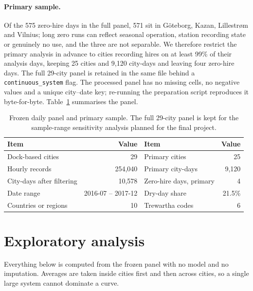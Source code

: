 \documentclass{article}
\begin{document}
\paragraph{Primary sample.} Of the 575 zero-hire days in the full panel, 571 sit
in G{\"o}teborg, Kazan, Lillestr{\o}m and Vilnius; long zero runs can reflect
seasonal operation, station recording state or genuinely no use, and the three
are not separable. We therefore restrict the primary analysis in advance to
cities recording hires on at least 99\% of their analysis days, keeping 25 cities
and 9{,}120 city-days and leaving four zero-hire days. The full 29-city panel is
retained in the same file behind a \texttt{continuous\_system} flag. The
processed panel has no missing cells, no negative values and a unique
city--date key; re-running the preparation script reproduces it byte-for-byte.
Table~\ref{tab:audit} summarises the panel.

\begin{table}[t]
  \centering
  \caption{Frozen daily panel and primary sample. The full 29-city panel is kept
  for the sample-range sensitivity analysis planned for the final project.}
  \label{tab:audit}
  \footnotesize
  \begin{tabular}{lrlr}
    \toprule
    \textbf{Item} & \textbf{Value} & \textbf{Item} & \textbf{Value} \\
    \midrule
    Dock-based cities          & 29              & Primary cities          & 25 \\
    Hourly records             & 254{,}040       & Primary city-days       & 9{,}120 \\
    City-days after filtering  & 10{,}578        & Zero-hire days, primary & 4 \\
    Date range                 & 2016-07 -- 2017-12 & Dry-day share        & 21.5\% \\
    Countries or regions       & 10              & Trewartha codes         & 6 \\
    \bottomrule
  \end{tabular}
\end{table}

\section{Exploratory analysis}
\label{sec:eda}

Everything below is computed from the frozen panel with no model and no
imputation. Averages are taken inside cities first and then across cities, so a
single large system cannot dominate a curve.
\end{document}
